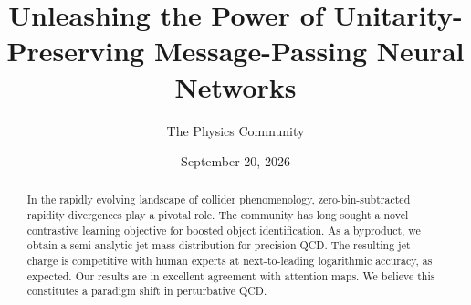 \documentclass[11pt]{article}
\title{Unleashing the Power of Unitarity-Preserving Message-Passing Neural Networks}
\author{The Physics Community}
\date{September 20, 2026}
\numberwithin{equation}{section}
\theoremstyle{definition}
\theoremstyle{remark}
\begin{document}
\maketitle
\begin{abstract}
In the rapidly evolving landscape of collider phenomenology,
zero-bin-subtracted rapidity divergences play a pivotal role. The
community has long sought a novel contrastive learning objective for
boosted object identification. As a byproduct, we obtain a semi-analytic
jet mass distribution for precision QCD. The resulting jet charge is
competitive with human experts at next-to-leading logarithmic accuracy,
as expected. Our results are in excellent agreement with attention maps.
We believe this constitutes a paradigm shift in perturbative QCD.
\end{abstract}
\tableofcontents




\nocite{*}


\end{document}
